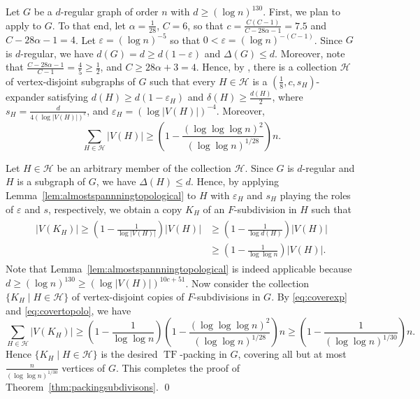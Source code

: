 \documentclass[10pt]{article}
\theoremstyle{plain}
\numberwithin{theorem}{section}
\theoremstyle{definition}
\theoremstyle{remark}
\renewenvironment{proof}[1][]{\begin{trivlist}
\item[\hspace{\labelsep}{\bf\noindent Proof#1.\/}] }{\qed\end{trivlist}}
\newcommand{\cH}{\mathcal{H}}
\newcommand{\eps}{\varepsilon}
\DeclareMathOperator{\TF}{TF}
\theoremstyle{plain}
\begin{document}
	\begin{proof}[ of Theorem~\ref{thm:packingsubdivisons}]
        Let $G$ be a $d$-regular graph of order $n$ with $d \ge (\log n)^{130}$. First, we plan to apply  to $G$. To that end, let $\alpha = \frac{1}{28}$, $C = 6$, so that $c = \frac{C(C-1)}{C - 28 \alpha-1} = 7.5$ and $C - 28 \alpha-1 = 4$. Let $\eps = (\log n)^{-5}$ so that $0 < \eps = (\log n)^{-(C-1)}$. Since $G$ is $d$-regular, we have $d(G) = d \ge d(1 - \eps)$ and $\Delta(G) \le d$. Moreover, note that $\frac{C - 28 \alpha-1}{C-1} = \frac{4}{5} \ge \frac{1}{2}$, and $C \ge 28 \alpha + 3 = 4$. Hence, by , there is a collection $\cH$ of vertex-disjoint subgraphs of $G$ such that every $H \in \cH$ is a $(\frac{1}{8}, c, s_H)$-expander satisfying $d(H) \ge d(1 - \eps_H)$ and $\delta(H) \ge \frac{d(H)}{2}$, where $s_H = \frac{d}{4 (\log |V(H)|)^{c}}$, and $\eps_H = (\log |V(H)|)^{-4}$. Moreover, 
		\begin{equation}
			\label{eq:coverexp}
			\sum_{H \in \cH} |V(H)| \ge \left(1 - \frac{(\log \log \log n)^2}{(\log \log n)^{1/28}}\right)n.
		\end{equation}

		Let $H \in \cH$ be an arbitrary member of the collection $\cH$. Since $G$ is $d$-regular and $H$ is a subgraph of $G$, we have $\Delta(H) \le d$. Hence, by applying Lemma~\ref{lem:almostspannningtopological} to $H$ with $\eps_H$ and $s_H$ playing the roles of $\eps$ and $s$, respectively, we obtain a copy $K_H$ of an $F$-subdivision in $H$ such that 
		\begin{align}
			\label{eq:covertopolo}
			\begin{split}
				|V(K_H)| 
				\ge \left(1 - \frac{1}{\log |V(H)|}\right) |V(H)| 
				& \ge \left(1 - \frac{1}{\log d(H)}\right) |V(H)|  \\
				& \ge \left(1 - \frac{1}{\log \log n}\right) |V(H)|.
			\end{split}
		\end{align}
		Note that Lemma~\ref{lem:almostspannningtopological} is indeed applicable because $d \ge (\log n)^{130} \ge (\log |V(H)|)^{10 c + 51}$. Now consider the collection $\{ K_H \mid H \in \cH \}$ of vertex-disjoint copies of $F$-subdivisions in $G$. By \eqref{eq:coverexp} and \eqref{eq:covertopolo}, we have
		\begin{equation*}
			\sum_{H \in \cH} |V(K_H)| \ge \left(1 - \frac{1}{\log \log n}\right)\left(1 - \frac{(\log \log \log n)^2}{(\log \log n)^{1/28}}\right)n \ge \left(1 - \frac{1}{(\log \log n)^{1/30}}\right)n.
		\end{equation*}
		Hence $\{ K_H \mid H \in \cH \}$ is the desired $\TF$-packing in $G$, covering all but at most $\frac{n}{(\log \log n)^{1/30}}$ vertices of $G$. This completes the proof of Theorem~\ref{thm:packingsubdivisons}.
	\end{proof}
\end{document}
